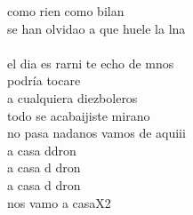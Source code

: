 \begin{cancion}[Sirenas][Taburete]
	como rien como bilan\\
	se han olvidao a que huele la lna\\
\jump\\
	el dia es rarni te echo de mnos\\
	podría tocare \\
	a cualquiera diezboleros\\
	todo se acabaijiste mirano\\
	no pasa nadanos vamos de aquiii\\
	a casa ddron\\
	a casa d dron\\
	a casa d dron\\
	nos vamo a casaX2\\
\end{cancion}%
